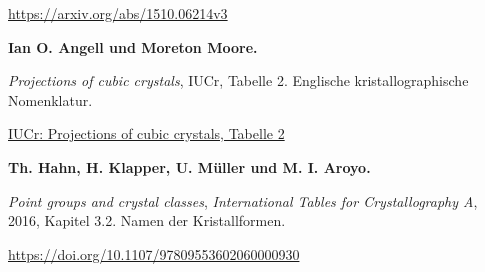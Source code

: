 \url{https://arxiv.org/abs/1510.06214v3}
\par\medskip\noindent\textbf{Ian O. Angell und Moreton Moore.}\par\nobreak\smallskip\noindent \emph{Projections of cubic crystals}, IUCr, Tabelle 2. Englische kristallographische Nomenklatur.\par
\href{https://www.iucr.org/what-we-do/education/pamphlets/projections-of-cubic-crystals}{IUCr: Projections of cubic crystals, Tabelle 2}
\par\medskip\noindent\textbf{Th. Hahn, H. Klapper, U. Müller und M. I. Aroyo.}\par\nobreak\smallskip\noindent \emph{Point groups and crystal classes}, \emph{International Tables for Crystallography A}, 2016, Kapitel 3.2. Namen der Kristallformen.\par
\url{https://doi.org/10.1107/97809553602060000930}



\clearpage\endgroup\clearpage
\setcounter{page}{\the\SavedTranslationPage}
\hypersetup{pageanchor=true}
